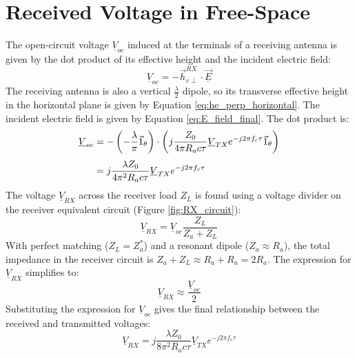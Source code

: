 \section{Received Voltage in Free-Space}
The open-circuit voltage $\underline{V}_{oc}$ induced at the terminals of a receiving antenna is given by the dot product of its effective height and the incident electric field:
\begin{equation}
	\underline{V}_{oc} = -\vec{h}_{e\perp}^{RX} \cdot \underline{\vec{E}}
\end{equation}
\vspace{0.5em}
The receiving antenna is also a vertical $\frac{\lambda}{2}$ dipole, so its transverse effective height in the horizontal plane is given by Equation \eqref{eq:he_perp_horizontal}. The incident electric field is given by Equation \eqref{eq:E_field_final}. The dot product is:
\vspace{1em}
\begin{align}
	\underline{V}_{oc} &= -\left(-\frac{\lambda}{\pi} \vec{1}_\theta\right) \cdot \left(j \frac{Z_0}{4\pi R_a c\tau} \underline{V}_{TX} e^{-j2\pi f_c \tau} \vec{1}_\theta\right) \\[\jot]
	&= j \frac{\lambda Z_0}{4\pi^2 R_a c\tau} \underline{V}_{TX} e^{-j2\pi f_c \tau}
\end{align}
\vspace{1em}
The voltage $\underline{V}_{RX}$ across the receiver load $Z_L$ is found using a voltage divider on the receiver equivalent circuit (Figure \ref{fig:RX_circuit}):
\begin{equation}
	\underline{V}_{RX} = \underline{V}_{oc} \frac{Z_L}{Z_a + Z_L}
\end{equation}
\vspace{0.5em}
With perfect matching ($Z_L = Z_a^*$) and a resonant dipole ($Z_a \approx R_a$), the total impedance in the receiver circuit is $Z_a + Z_L \approx R_a + R_a = 2R_a$. The expression for $\underline{V}_{RX}$ simplifies to:
\begin{equation}
	\underline{V}_{RX} \approx \frac{\underline{V}_{oc}}{2}
\end{equation}
\vspace{0.5em}
Substituting the expression for $\underline{V}_{oc}$ gives the final relationship between the received and transmitted voltages:
\begin{equation}
	\boxed{\underline{V}_{RX} = j \frac{\lambda Z_0}{8\pi^2 R_a c\tau} \underline{V}_{TX} e^{-j2\pi f_c \tau}}
	\label{eq:VRX_vs_VTX}
\end{equation}
